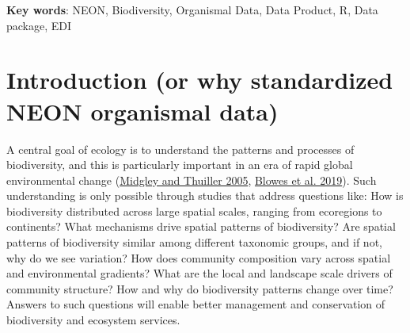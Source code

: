 \documentclass[
  12pt,
]{article}
\begin{document}
\textbf{Key words}: NEON, Biodiversity, Organismal Data, Data Product, R, Data package, EDI

\hypertarget{introduction-or-why-standardized-neon-organismal-data}{%
\section{Introduction (or why standardized NEON organismal data)}\label{introduction-or-why-standardized-neon-organismal-data}}

A central goal of ecology is to understand the patterns and processes of biodiversity, and this is particularly important in an era of rapid global environmental change (\protect\hyperlink{ref-midgley2005global}{Midgley and Thuiller 2005}, \protect\hyperlink{ref-blowes2019geography}{Blowes et al. 2019}). Such understanding is only possible through studies that address questions like: How is biodiversity distributed across large spatial scales, ranging from ecoregions to continents? What mechanisms drive spatial patterns of biodiversity? Are spatial patterns of biodiversity similar among different taxonomic groups, and if not, why do we see variation? How does community composition vary across spatial and environmental gradients? What are the local and landscape scale drivers of community structure? How and why do biodiversity patterns change over time? Answers to such questions will enable better management and conservation of biodiversity and ecosystem services.
\end{document}

